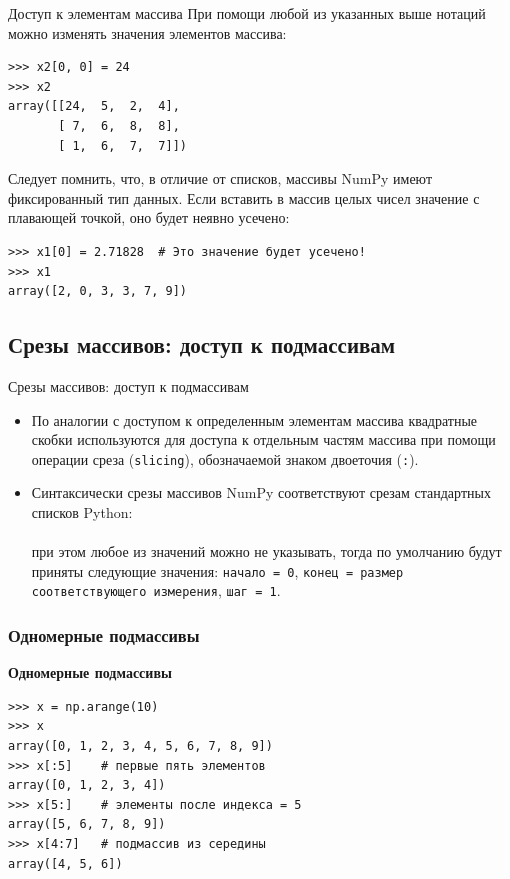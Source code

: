 \documentclass[aspectratio=169, mathserif]{beamer}%
\begin{document}
\begin{frame}[fragile]{Доступ к элементам массива}
\scriptsize
При помощи любой из указанных выше нотаций можно изменять значения элементов массива:

\begin{verbatim}
>>> x2[0, 0] = 24
>>> x2
array([[24,  5,  2,  4],
       [ 7,  6,  8,  8],
       [ 1,  6,  7,  7]])
\end{verbatim}

Следует помнить, что, в отличие от списков, массивы NumPy имеют фиксированный тип данных.
Если вставить в массив целых чисел значение с плавающей точкой, оно будет неявно усечено:

\begin{verbatim}
>>> x1[0] = 2.71828  # Это значение будет усечено!
>>> x1
array([2, 0, 3, 3, 7, 9])
\end{verbatim}
\vfill
\end{frame}

\subsection{Срезы массивов: доступ к подмассивам}
\begin{frame}[fragile]{Срезы массивов: доступ к подмассивам}
\scriptsize
\begin{itemize}
\item По аналогии с доступом к определенным элементам массива квадратные скобки используются для доступа к отдельным частям массива при помощи операции среза (\texttt{slicing}), обозначаемой знаком двоеточия (\texttt{:}).
\item Синтаксически срезы массивов NumPy соответствуют  срезам стандартных списков Python:
\\

\\
\noindent при этом любое из значений можно не указывать, тогда по умолчанию будут приняты следующие значения: \texttt{начало = 0}, \texttt{конец = размер соответствующего измерения}, \texttt{шаг = 1}.
\end{itemize}
\subsubsection{Одномерные подмассивы}
\begin{alertblock}{\textbf{Одномерные подмассивы}}
\begin{verbatim}
>>> x = np.arange(10)
>>> x
array([0, 1, 2, 3, 4, 5, 6, 7, 8, 9])
>>> x[:5]    # первые пять элементов
array([0, 1, 2, 3, 4])
>>> x[5:]    # элементы после индекса = 5
array([5, 6, 7, 8, 9])
>>> x[4:7]   # подмассив из середины
array([4, 5, 6])
\end{verbatim}
\end{alertblock}
\vfil
\end{frame}
\end{document}
